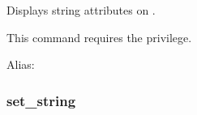 \documentclass[letterpaper,10pt,english]{sphinxmanual}
\begin{document}
\sphinxAtStartPar
Displays string attributes on .

\sphinxAtStartPar
This command requires the  privilege.

\sphinxAtStartPar
Alias: 


\subsubsection{set\_string}
\label{\detokenize{admin/admin_commands/kadmin_local:set-string}}\label{\detokenize{admin/admin_commands/kadmin_local:id11}}\begin{quote}

\sphinxAtStartPar
{}   
\end{quote}
\end{document}
